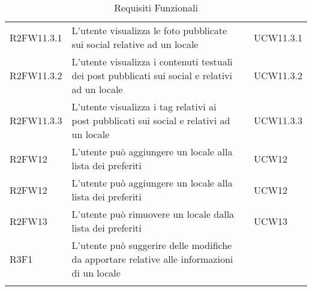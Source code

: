\begin{longtable}{ m{}<{\centering}  m{}<{\centering}  m{}<{\centering}  m{}<{\centering}}
	R2FW11.3.1 & L’utente visualizza le foto pubblicate sui social relative ad un locale & \De & UCW11.3.1 \\
	R2FW11.3.2 & L’utente visualizza i contenuti testuali dei post pubblicati sui social e relativi ad un locale & \De & UCW11.3.2 \\
	R2FW11.3.3 & L’utente visualizza i tag relativi ai post pubblicati sui social e relativi ad un locale & \De & UCW11.3.3 \\ 	 	 	

	R2FW12 & L’utente può aggiungere un locale alla lista dei preferiti & \De &  UCW12\\ 	 	 	

	R2FW12 & L’utente può aggiungere un locale alla lista dei preferiti & \De &  UCW12\\

	R2FW13 & L’utente può rimuovere un locale dalla lista dei preferiti & \De & UCW13\\

	R3F1 & L’utente può suggerire delle modifiche da apportare relative alle informazioni di un locale & \Fa & \Di \\

	\hiderowcolors \caption{Requisiti Funzionali}
\end{longtable}

\clearpage